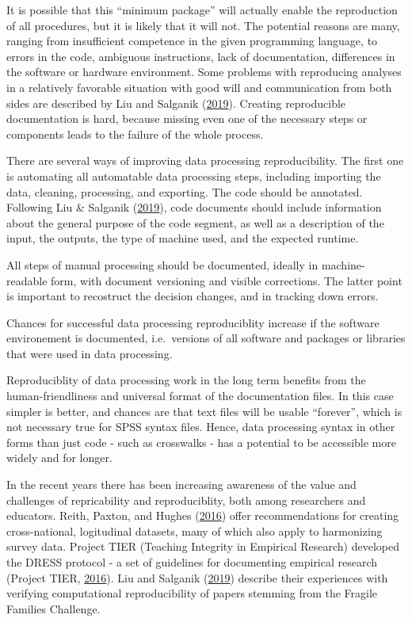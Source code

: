 \documentclass[12pt,]{article}
\begin{document}
It is possible that this ``minimum package'' will actually enable the reproduction of all procedures, but it is likely that it will not. The potential reasons are many, ranging from insufficient competence in the given programming language, to errors in the code, ambiguous instructions, lack of documentation, differences in the software or hardware environment. Some problems with reproducing analyses in a relatively favorable situation with good will and communication from both sides are described by Liu and Salganik (\protect\hyperlink{ref-Liu2019}{2019}). Creating reproducible documentation is hard, because missing even one of the necessary steps or components leads to the failure of the whole process.

There are several ways of improving data processing reproducibility. The first one is automating all automatable data processing steps, including importing the data, cleaning, processing, and exporting. The code should be annotated. Following Liu \& Salganik (\protect\hyperlink{ref-Liu2019}{2019}), code documents should include information about the general purpose of the code segment, as well as a description of the input, the outputs, the type of machine used, and the expected runtime.

All steps of manual processing should be documented, ideally in machine-readable form, with document versioning and visible corrections. The latter point is important to recostruct the decision changes, and in tracking down errors.

Chances for successful data processing reproduciblity increase if the software environement is documented, i.e.~versions of all software and packages or libraries that were used in data processing.

Reproduciblity of data processing work in the long term benefits from the human-friendliness and universal format of the documentation files. In this case simpler is better, and chances are that text files will be usable ``forever'', which is not necessary true for SPSS syntax files. Hence, data processing syntax in other forms than just code - such as crosswalks - has a potential to be accessible more widely and for longer.

In the recent years there has been increasing awareness of the value and challenges of repricability and reproduciblity, both among researchers and educators.
Reith, Paxton, and Hughes (\protect\hyperlink{ref-Reith2016}{2016}) offer recommendations for creating cross-national, logitudinal datasets, many of which also apply to harmonizing survey data. Project TIER (Teaching Integrity in Empirical Research) developed the DRESS protocol - a set of guidelines for documenting empirical research (Project TIER, \protect\hyperlink{ref-ProjectTIER2016}{2016}). Liu and Salganik (\protect\hyperlink{ref-Liu2019}{2019}) describe their experiences with verifying computational reproducibility of papers stemming from the Fragile Families Challenge.
\end{document}
